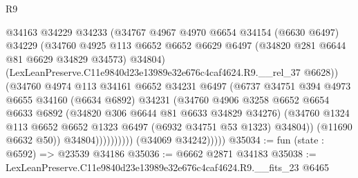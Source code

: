 \begin{lexlean}{R9}
\begin{coremodule}
                              @34163
                              @34229
                              @34233
                              (@34767
                                @4967
                                @4970
                                @6654
                                @34154
                                (@6630 @6497)
                                @34229
                                (@34760
                                  @4925
                                  @113
                                  @6652
                                  @6652
                                  @6629
                                  @6497
                                  (@34820 @281 @6644 @81 @6629 @34829 @34573)
                                  @34804)
                                (LexLeanPreserve.C11e9840d23e13989e32e676c4caf4624.R9.__rel_37
                                  @6628))
                              (@34760
                                @4974
                                @113
                                @34161
                                @6652
                                @34231
                                @6497
                                (@6737
                                  @34751
                                  @394
                                  @4973
                                  @6655
                                  @34160
                                  (@6634 @6892)
                                  @34231
                                  (@34760
                                    @4906
                                    @3258
                                    @6652
                                    @6654
                                    @6633
                                    @6892
                                    (@34820 @306 @6644 @81 @6633 @34829 @34276)
                                    (@34760
                                      @1324
                                      @113
                                      @6652
                                      @6652
                                      @1323
                                      @6497
                                      (@6932 @34751 @53 @1323)
                                      @34804))
                                  (@11690 @6632 @50))
                                @34804))))))))))
            (@34069 @34242)))))
@35034 := fun (state : @6592) => @23539 @34186
@35036 := @6662 @2871 @34183
@35038 := LexLeanPreserve.C11e9840d23e13989e32e676c4caf4624.R9.__fits_23 @6465

\end{coremodule}
\end{lexlean}
